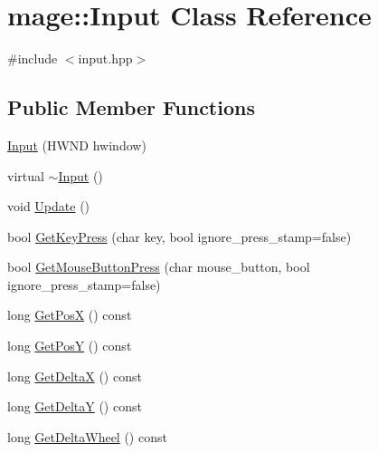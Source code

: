 \hypertarget{classmage_1_1_input}{}\section{mage\+:\+:Input Class Reference}
\label{classmage_1_1_input}


{\ttfamily \#include $<$input.\+hpp$>$}

\subsection*{Public Member Functions}
\begin{DoxyCompactItemize}
\item 
\hyperlink{classmage_1_1_input_a036b38f787b45d14ff92f360303b33af}{Input} (H\+W\+ND hwindow)
\item 
virtual \hyperlink{classmage_1_1_input_a52324bfe97e7245176f77ac9e635df53}{$\sim$\+Input} ()
\item 
void \hyperlink{classmage_1_1_input_ab152509540c3f41d337296edc2aea660}{Update} ()
\item 
bool \hyperlink{classmage_1_1_input_aed069ebf04f32b924a9f1d5a1371f69a}{Get\+Key\+Press} (char key, bool ignore\+\_\+press\+\_\+stamp=false)
\item 
bool \hyperlink{classmage_1_1_input_a8995df2b027f8a168feea5c2927251fb}{Get\+Mouse\+Button\+Press} (char mouse\+\_\+button, bool ignore\+\_\+press\+\_\+stamp=false)
\item 
long \hyperlink{classmage_1_1_input_a5b839b6ead23e1c0ec623fb82c5d6e45}{Get\+PosX} () const
\item 
long \hyperlink{classmage_1_1_input_a4c7d46233ccf74d45c28549e5ecdd244}{Get\+PosY} () const
\item 
long \hyperlink{classmage_1_1_input_a6fcfe61fc9f5a2575375c7e2c39507f5}{Get\+DeltaX} () const
\item 
long \hyperlink{classmage_1_1_input_ac63b55db4438989d2c6729a358ace296}{Get\+DeltaY} () const
\item 
long \hyperlink{classmage_1_1_input_a59c042bc18b47bca3010eb4df7de44c2}{Get\+Delta\+Wheel} () const
\end{DoxyCompactItemize}
